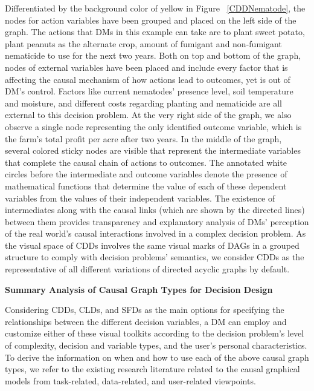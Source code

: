 \documentclass{sfuthesis}
\begin{document}
Differentiated by the background color of yellow in Figure ~\ref{CDDNematode}, the nodes for action variables have been grouped and placed on the left side of the graph. The actions that DMs in this example can take are to plant sweet potato, plant peanuts as the alternate crop, amount of fumigant and non-fumigant nematicide to use for the next two years. Both on top and bottom of the graph, nodes of external variables have been placed and include every factor that is affecting the causal mechanism of how actions lead to outcomes, yet is out of DM’s control. Factors like current nematodes’ presence level, soil temperature and moisture, and different costs regarding planting and nematicide are all external to this decision problem. At the very right side of the graph, we also observe a single node representing the only identified outcome variable, which is the farm’s total profit per acre after two years. In the middle of the graph, several colored sticky nodes are visible that represent the intermediate variables that complete the causal chain of actions to outcomes. The annotated white circles before the intermediate and outcome variables denote the presence of mathematical functions that determine the value of each of these dependent variables from the values of their independent variables. The existence of intermediates along with the causal links (which are shown by the directed lines) between them provides transparency and explanatory analysis of DMs’ perception of the real world’s causal interactions involved in a complex decision problem. As the visual space of CDDs involves the same visual marks of DAGs in a grouped structure to comply with decision problems' semantics, we consider CDDs as the representative of all different variations of directed acyclic graphs by default.\par
\noindent \textbf{Summary Analysis of Causal Graph Types for Decision Design}\par
Considering CDDs, CLDs, and SFDs as the main options for specifying the relationships between the different decision variables, a DM can employ and customize either of these visual toolkits according to the decision problem’s level of complexity, decision and variable types, and the user’s personal characteristics. To derive the information on when and how to use each of the above causal graph types, we refer to the existing research literature related to the causal graphical models from task-related, data-related, and user-related viewpoints.\par
\end{document}
